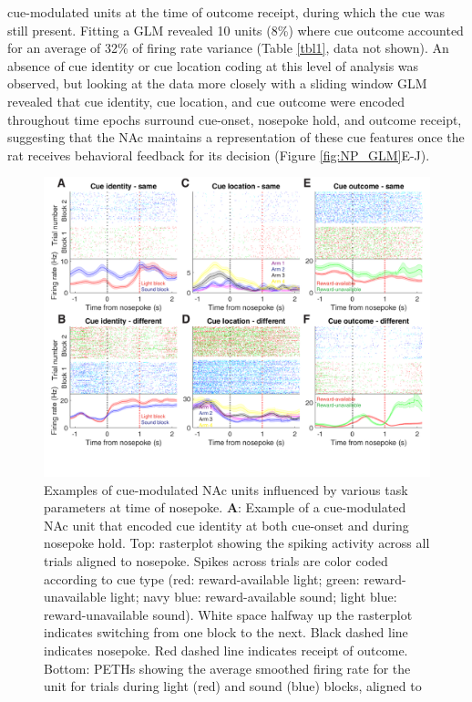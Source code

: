 \documentclass[11pt]{article}
\newcommand{\bsf}[1]{\textbf{#1}}
\begin{document}
cue-modulated units at the time of outcome receipt, during which the cue was
still present. Fitting a GLM revealed 10 units (8\%) where cue outcome accounted
for an average of 32\% of firing rate variance (Table \ref{tbl1}, data not
shown). An absence of cue identity or cue location coding at this level of analysis was observed,
but looking at the data more closely with a sliding window GLM revealed that
cue identity, cue location, and cue outcome were encoded throughout time epochs surround cue-onset, nosepoke hold, and outcome receipt,
suggesting that the NAc maintains a representation of these cue features once the rat receives behavioral feedback for its decision (Figure \ref{fig:NP_GLM}E-J).

\begin{figure}[h]
\centering
\includegraphics[width=\textwidth]{Fig 9 - NP Neural examples.png}
\caption{Examples of cue-modulated NAc units influenced by various task
parameters at time of nosepoke. \bsf{A}: Example of a cue-modulated NAc unit
that encoded cue identity at both cue-onset and during nosepoke hold. Top:
rasterplot showing the spiking activity across all trials aligned to
nosepoke. Spikes across trials are color coded according to cue type (red:
reward-available light; green: reward-unavailable light; navy blue:
reward-available sound; light blue: reward-unavailable sound). White space
halfway up the rasterplot indicates switching from one block to the
next. Black dashed line indicates nosepoke. Red dashed line indicates receipt
of outcome. Bottom: PETHs showing the average smoothed firing rate for the
unit for trials during light (red) and sound (blue) blocks, aligned to
}
\end{figure}
\end{document}
